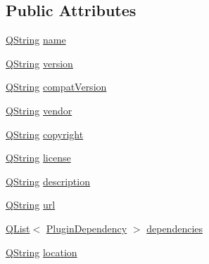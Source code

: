 \subsection*{Public Attributes}
\begin{DoxyCompactItemize}
\item 
\hyperlink{group___u_a_v_objects_plugin_gab9d252f49c333c94a72f97ce3105a32d}{Q\-String} \hyperlink{class_extension_system_1_1_internal_1_1_plugin_spec_private_ab3a82ed362b9755352316778bda2c635}{name}
\item 
\hyperlink{group___u_a_v_objects_plugin_gab9d252f49c333c94a72f97ce3105a32d}{Q\-String} \hyperlink{class_extension_system_1_1_internal_1_1_plugin_spec_private_a00cf7a310301d427a56b1b23576289bc}{version}
\item 
\hyperlink{group___u_a_v_objects_plugin_gab9d252f49c333c94a72f97ce3105a32d}{Q\-String} \hyperlink{class_extension_system_1_1_internal_1_1_plugin_spec_private_a5bca4f5cd92049fabd441bf9ae2a9734}{compat\-Version}
\item 
\hyperlink{group___u_a_v_objects_plugin_gab9d252f49c333c94a72f97ce3105a32d}{Q\-String} \hyperlink{class_extension_system_1_1_internal_1_1_plugin_spec_private_a3628c7ebcd80e71dd74fc0df729aac7a}{vendor}
\item 
\hyperlink{group___u_a_v_objects_plugin_gab9d252f49c333c94a72f97ce3105a32d}{Q\-String} \hyperlink{class_extension_system_1_1_internal_1_1_plugin_spec_private_a20718c1d11fe66633f33bfccc7dbfdf6}{copyright}
\item 
\hyperlink{group___u_a_v_objects_plugin_gab9d252f49c333c94a72f97ce3105a32d}{Q\-String} \hyperlink{class_extension_system_1_1_internal_1_1_plugin_spec_private_a8060ccf842513091c9821ad6118a22c0}{license}
\item 
\hyperlink{group___u_a_v_objects_plugin_gab9d252f49c333c94a72f97ce3105a32d}{Q\-String} \hyperlink{class_extension_system_1_1_internal_1_1_plugin_spec_private_a477c1550169cba561d0cede9d8dc5c2b}{description}
\item 
\hyperlink{group___u_a_v_objects_plugin_gab9d252f49c333c94a72f97ce3105a32d}{Q\-String} \hyperlink{class_extension_system_1_1_internal_1_1_plugin_spec_private_a6872e7bd6f42c91c16e3fcd03554f004}{url}
\item 
\hyperlink{class_q_list}{Q\-List}$<$ \hyperlink{struct_extension_system_1_1_plugin_dependency}{Plugin\-Dependency} $>$ \hyperlink{class_extension_system_1_1_internal_1_1_plugin_spec_private_a1f765a1f76bd2ba2f296f84289e9b44f}{dependencies}
\item 
\hyperlink{group___u_a_v_objects_plugin_gab9d252f49c333c94a72f97ce3105a32d}{Q\-String} \hyperlink{class_extension_system_1_1_internal_1_1_plugin_spec_private_a69f6532837e17c9858580b506b5c3448}{location}

\end{DoxyCompactItemize}
